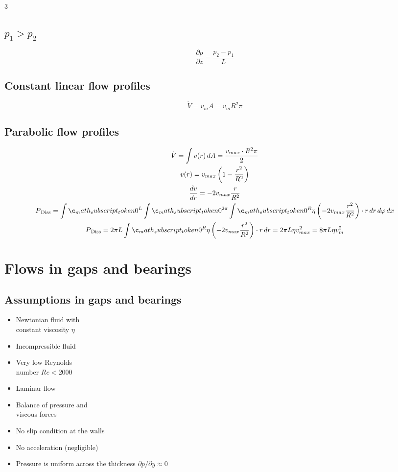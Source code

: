 \documentclass[9pt, landscape, a4paper]{article}
\begin{document}
\begin{multicols*}{3}
\subsection{$p_1 > p_2$}
\[\frac{\partial p}{\partial z} = \frac{p_2 - p_1}{L}\]

\subsection{Constant linear flow profiles}
\[\dot{V} = v_m A = v_m R^2 \pi\]

\subsection{Parabolic flow profiles}
\begin{gather*}
  \dot{V} = \integral[v(r)][A] = \dfrac{v_{max}\cdot R^2\pi}{2}\\
  v(r) = v_{max}\left(1-\dfrac{r^2}{R^2}\right)\\
  \dfrac{dv}{dr} = -2v_{max}\dfrac{r}{R^2}\\
  P_{\, \text{Diss}} = \integral[0][L][\integral[0][2\pi][\integral[0][R][\eta\left(-2v_{max}\dfrac{r^2}{R^2}\right)\cdot r][r]][\varphi]][x]\\
  P_{\, \text{Diss}} = 2\pi L \integral[0][R][\eta\left(-2v_{max}\dfrac{r^2}{R^2}\right)\cdot r][r] = 2\pi L\eta v_{max}^2 = 8\pi L\eta v_{m}^2
\end{gather*}

\section{Flows in gaps and bearings}
\subsection{Assumptions in gaps and bearings}
\begin{minipage}[t]{0.5\linewidth}
  \begin{itemize}
    \item Newtonian fluid with\\constant viscosity $\eta$
    \item Incompressible fluid
    \item Very low Reynolds\\number $Re < 2000$
    \item Laminar flow
  \end{itemize}
  \end{minipage}%
\begin{minipage}[t]{0.5\linewidth}
  \begin{itemize}
    \item Balance of pressure and\\viscous forces
    \item No slip condition at the walls
    \item No acceleration (negligible)
    \item Pressure is uniform across the thickness $\partial p/\partial y \approx 0$
  \end{itemize}
\end{minipage}


\end{multicols*}
\end{document}
